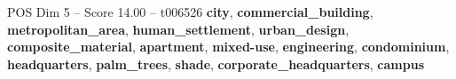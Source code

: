 \begin{textsample}{POS Dim 5 – Score 14.00 – t006526}  \label{ex:f5_pos_038}
\textbf{city}, \textbf{commercial\_building}, \textbf{metropolitan\_area}, \textbf{human\_settlement}, \textbf{urban\_design}, \textbf{composite\_material}, \textbf{apartment}, \textbf{mixed-use}, \textbf{engineering}, \textbf{condominium}, \textbf{headquarters}, \textbf{palm\_trees}, \textbf{shade}, \textbf{corporate\_headquarters}, \textbf{campus}

\end{textsample}
